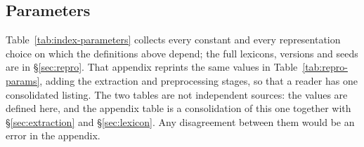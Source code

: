 \subsection{Parameters}
\label{sec:index-parameters}

Table~\ref{tab:index-parameters} collects every constant and every
representation choice on which the definitions above depend; the full
lexicons, versions and seeds are in \S\ref{sec:repro}. That appendix reprints
the same values in Table~\ref{tab:repro-params}, adding the extraction and
preprocessing stages, so that a reader has one consolidated listing. The two
tables are not independent sources: the values are defined here, and the
appendix table is a consolidation of this one together with
\S\ref{sec:extraction} and \S\ref{sec:lexicon}. Any disagreement between them
would be an error in the appendix.

